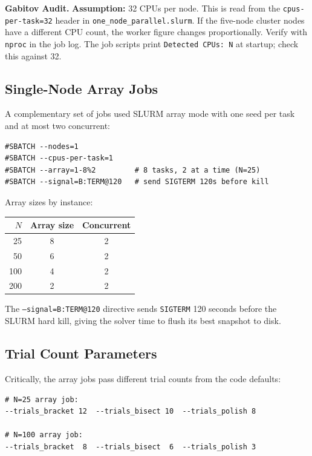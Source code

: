 \documentclass[11pt,oneside]{article}
\newcommand{\gabitov}[1]{\begin{gabitovbox}\textbf{Gabitov Audit.} #1\end{gabitovbox}}
\begin{document}
\gabitov{%
\textbf{Assumption:} 32 CPUs per node. This is read from the
\texttt{cpus-per-task=32} header in \texttt{one\_node\_parallel.slurm}.
If the five-node cluster nodes have a different CPU count, the worker
figure changes proportionally. Verify with \texttt{nproc} in the job
log. The job scripts print \texttt{Detected CPUs: N} at startup; check
this against 32.%
}

\subsection{Single-Node Array Jobs}

A complementary set of jobs used SLURM array mode with one seed per
task and at most two concurrent:

\begin{lstlisting}[style=bashstyle,caption={Array job header from \texttt{old\_n25\_4h.slurm}.}]
#SBATCH --nodes=1
#SBATCH --cpus-per-task=1
#SBATCH --array=1-8%2         # 8 tasks, 2 at a time (N=25)
#SBATCH --signal=B:TERM@120   # send SIGTERM 120s before kill
\end{lstlisting}

Array sizes by instance:

\begin{center}
\begin{tabular}{rcc}
\toprule
$N$ & Array size & Concurrent \\
\midrule
25  & 8  & 2 \\
50  & 6  & 2 \\
100 & 4  & 2 \\
200 & 2  & 2 \\
\bottomrule
\end{tabular}
\end{center}

The \texttt{--signal=B:TERM@120} directive sends \texttt{SIGTERM} 120
seconds before the SLURM hard kill, giving the solver time to flush its
best snapshot to disk.

\subsection{Trial Count Parameters}

Critically, the array jobs pass different trial counts from the code
defaults:

\begin{lstlisting}[style=bashstyle,caption={Trial counts in \texttt{old\_n25\_4h.slurm} vs.\ \texttt{old\_n100\_4h.slurm}.}]
# N=25 array job:
--trials_bracket 12  --trials_bisect 10  --trials_polish 8

# N=100 array job:
--trials_bracket  8  --trials_bisect  6  --trials_polish 3
\end{lstlisting}
\end{document}
